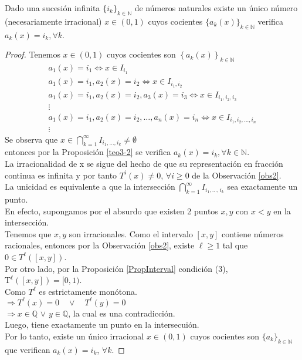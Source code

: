 \begin{prop}
Dado una sucesión infinita $\{i_{k}\}_{k\in\mathbb{N}}$ de números naturales existe un único número (necesariamente irracional) $x \in(0,1)$ cuyos cocientes $\{ a_{k}(x)\}_{k\in\mathbb{N}}$ verifica $a_{k}(x)=i_{k}, \forall k$.
\label{teo3-3}
\end{prop}
\begin{proof}
Tenemos $x \in(0,1)$ cuyos cocientes son $\left\{a_{k}(x)\right\}_{k\in\mathbb{N}}$
\begin{equation*}
    \begin{array}{l}
    a_{1}(x)=i_{1} \Longleftrightarrow x \in I_{i_{1}}\\
    a_{1}(x)=i_{1}, a_{2}(x)=i_{2} \Longleftrightarrow x \in I_{i_{1}, i_{2}}\\
    a_{1}(x)=i_{1}, a_{2}(x)=i_{2}, a_{3}(x)=i_{3} \Longleftrightarrow x \in I_{i_{1}, i_{2}, i_{3}}
    \\
    \vdots
    \\
    a_{1}(x)=i_{1}, a_{2}(x)=i_{2}, \ldots, a_{n}(x)=i_{n} \Longleftrightarrow x \in I_{i_{1}, i_{2}, \ldots, i_{n}}
    \\
    \vdots
    \end{array}
    \end{equation*}
    Se observa que $x \in \displaystyle\bigcap_{k=1}^{\infty} I_{i_{1}, \ldots, i_{k}} \neq \emptyset$
    \\
    entonces por la Proposición \ref{teo3-2} se verifica $a_{k}(x)=i_{k}, \forall k \in \mathbb{N}$.
    \\
    La irracionalidad de x se sigue del hecho de que su representación en fracción continua es infinita y por tanto $T^{i}(x) \neq 0$,  $\forall i \geqslant 0$ de la Observación \ref{obs2}.
    \\
    La unicidad es equivalente a que la intersección $\displaystyle\bigcap_{k=1}^{\infty}I_{i_{1},\ldots,i_{k}}$ sea exactamente un punto.
    \\
    En efecto, supongamos por el absurdo que existen 2 puntos $x,y$ con $x<y$ en la intersección.
    \\
    Tenemos que $x, y$ son irracionales. Como el intervalo $[x, y]$ contiene números racionales, entonces por la Observación \ref{obs2}, existe $\ell\geq1$ tal que $0\in T^{\ell}([x,y])$.
    \\
    Por otro lado, por la Proposición \ref{PropInterval} condición (3), $\mathrm{T}^{\ell}([x, y])=[0,1)$.
    \\
    Como $T^{\ell}$ es estrictamente monótona.
    \\
    $\Rightarrow T^{\ell}(x)=0 \quad \vee \quad T^{\ell}(y)=0$
    \\
    $\Rightarrow x\in\mathbb{Q}$ $\vee$ $y\in\mathbb{Q}$, la cual es una contradicción.
    \\
    Luego, tiene exactamente un punto en la intersecuión.
    \\
    Por lo tanto, existe un único irracional $x\in(0,1)$ cuyos cocientes son $\{a_{k}\}_{k\in\mathbb{N}}$ que verifican $a_{k}(x)=i_{k}$, $\forall k$.
\end{proof}
